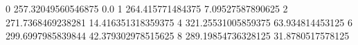0 257.32049560546875 0.0
1 264.415771484375 7.09527587890625
2 271.7368469238281 14.416351318359375
4 321.25531005859375 63.934814453125
6 299.6997985839844 42.379302978515625
8 289.19854736328125 31.8780517578125

